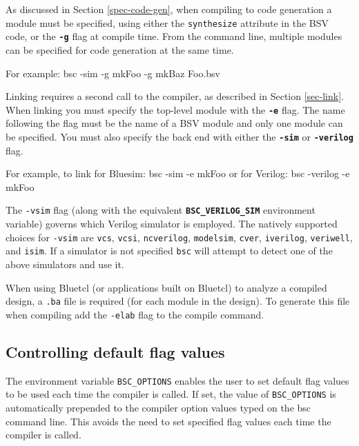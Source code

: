 \documentclass{article}
\newcommand{\te}[1]{\texttt{#1}}
\newenvironment{centerboxverbatim}
  {\center
   \boxedverbatim}
  {\endboxedverbatim
  {\endcenter }}
\begin{document}
As discussed in Section \ref{spec-code-gen}, when compiling to
code generation  a module must be specified, using either  the \te{synthesize}
attribute in the BSV code, or  the {\bf\tt -g} flag at compile
time.  From the command line,
multiple modules can be specified for code generation at the same time.

For example:
\begin{centerboxverbatim}
bsc -sim -g mkFoo -g mkBaz Foo.bsv
\end{centerboxverbatim}

Linking requires a second call to the compiler, as described in
Section \ref{sec-link}.  When linking you must specify the
top-level module with the {\bf\tt -e} flag.  The name following the
flag must be the name of  a BSV module and only one module can be
specified.   You must also specify the back end with either the
{\bf\tt -sim}   or {\bf\tt -verilog} flag.

For example, to link for Bluesim:
\begin{centerboxverbatim}
bsc -sim -e mkFoo
\end{centerboxverbatim}
or for Verilog:
\begin{centerboxverbatim}
bsc -verilog -e mkFoo
\end{centerboxverbatim}


The \te{-vsim} flag
(along with the equivalent
\textbf{\texttt{BSC\_VERILOG\_SIM}} environment variable) governs which Verilog
simulator is employed.  The natively supported  choices for
\te{-vsim} are \te{vcs}, \te{vcsi}, \te{ncverilog},
\te{modelsim}, \te{cver},  \te{iverilog},  \te{veriwell}, and \te{isim}.  If a
simulator  is not specified \te{bsc} will attempt to detect one
of the above simulators and use it.


When using Bluetcl (or applications built on Bluetcl) to analyze a compiled
design, a \te{.ba} file is required (for each module in the design).
To generate this file when compiling add the \te{-elab} flag to the compile command. 



\subsection{Controlling default flag values}
\index{BSC\_OPTIONS@\te{BSC\_OPTIONS}}

The environment variable \te{BSC\_OPTIONS} enables the user to set
default flag values to be used each time the compiler is called.  If
set, the value of \te{BSC\_OPTIONS} is automatically  prepended to the
compiler option values  typed on the bsc command line.  This avoids
the need to set specified flag values each time the compiler is called.
\end{document}
